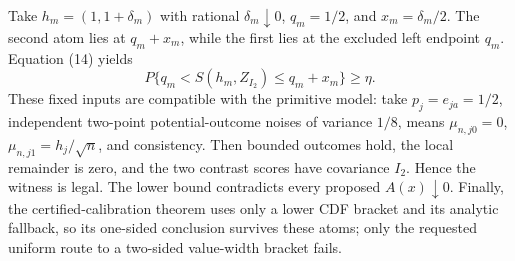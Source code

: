 Take \(h_m=(1,1+\delta_m)\) with rational \(\delta_m\downarrow0\), \(q_m=1/2\), and \(x_m=\delta_m/2\).  The second atom lies at \(q_m+x_m\), while the first lies at the excluded left endpoint \(q_m\).  Equation (14) yields
\[
 P\{q_m<S(h_m,Z_{I_2})\le q_m+x_m\}\ge\eta.
\]
These fixed inputs are compatible with the primitive model: take \(p_j=e_{ja}=1/2\), independent two-point potential-outcome noises of variance \(1/8\), means \(\mu_{n,j0}=0\), \(\mu_{n,j1}=h_j/\sqrt n\), and consistency.  Then bounded outcomes hold, the local remainder is zero, and the two contrast scores have covariance \(I_2\).  Hence the witness is legal.  The lower bound contradicts every proposed \(A(x)\downarrow0\).  Finally, the certified-calibration theorem uses only a lower CDF bracket and its analytic fallback, so its one-sided conclusion survives these atoms; only the requested uniform route to a two-sided value-width bracket fails.

